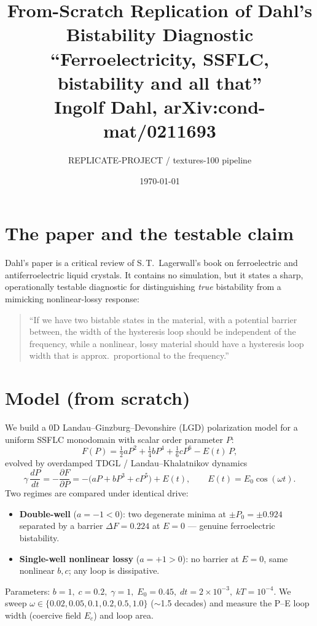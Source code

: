 \documentclass[11pt]{article}
\title{From-Scratch Replication of Dahl's Bistability Diagnostic\\
\large ``Ferroelectricity, SSFLC, bistability and all that''\\
Ingolf Dahl, arXiv:cond-mat/0211693}
\author{REPLICATE-PROJECT / textures-100 pipeline}
\date{\today}
\begin{document}
\maketitle

\section{The paper and the testable claim}
Dahl's paper is a critical review of S.\,T.\ Lagerwall's book on ferroelectric
and antiferroelectric liquid crystals. It contains no simulation, but it states
a sharp, operationally testable diagnostic for distinguishing \emph{true}
bistability from a mimicking nonlinear-lossy response:

\begin{quote}
``If we have two bistable states in the material, with a potential barrier
between, the width of the hysteresis loop should be independent of the
frequency, while a nonlinear, lossy material should have a hysteresis loop
width that is approx.\ proportional to the frequency.''
\end{quote}

\section{Model (from scratch)}
We build a $0$D Landau--Ginzburg--Devonshire (LGD) polarization model for a
uniform SSFLC monodomain with scalar order parameter $P$:
\begin{equation}
F(P) = \tfrac12 a P^2 + \tfrac14 b P^4 + \tfrac16 c P^6 - E(t)\,P ,
\end{equation}
evolved by overdamped TDGL / Landau--Khalatnikov dynamics
\begin{equation}
\gamma\,\frac{dP}{dt} = -\frac{\partial F}{\partial P}
   = -\bigl(a P + b P^3 + c P^5\bigr) + E(t), \qquad E(t)=E_0\cos(\omega t).
\end{equation}
Two regimes are compared under identical drive:
\begin{itemize}
\item \textbf{Double-well} ($a=-1<0$): two degenerate minima at
$\pm P_0=\pm0.924$ separated by a barrier $\Delta F=0.224$ at $E=0$ ---
genuine ferroelectric bistability.
\item \textbf{Single-well nonlinear lossy} ($a=+1>0$): no barrier at $E=0$,
same nonlinear $b,c$; any loop is dissipative.
\end{itemize}
Parameters: $b=1,\;c=0.2,\;\gamma=1,\;E_0=0.45,\;dt=2\times10^{-3},\;kT=10^{-4}$.
We sweep $\omega\in\{0.02,0.05,0.1,0.2,0.5,1.0\}$ ($\sim$1.5 decades) and measure
the P--E loop width (coercive field $E_c$) and loop area.
\end{document}
